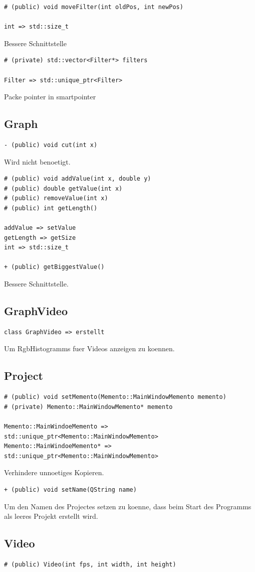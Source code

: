 \documentclass{scrartcl}
\begin{document}
{\begin{verbatim}
# (public) void moveFilter(int oldPos, int newPos)

int => std::size_t
\end{verbatim}
Bessere Schnittstelle
\begin{verbatim}
# (private) std::vector<Filter*> filters

Filter => std::unique_ptr<Filter>
\end{verbatim}
Packe pointer in smartpointer
\subsection{Graph}
\begin{verbatim}
- (public) void cut(int x)
\end{verbatim}
Wird nicht benoetigt.
\begin{verbatim}
# (public) void addValue(int x, double y)
# (public) double getValue(int x)
# (public) removeValue(int x)
# (public) int getLength()

addValue => setValue
getLength => getSize
int => std::size_t

+ (public) getBiggestValue()
\end{verbatim}
Bessere Schnittstelle.
\subsection{GraphVideo}
\begin{verbatim}
class GraphVideo => erstellt
\end{verbatim}
Um RgbHistogramms fuer Videos anzeigen zu koennen.
\subsection{Project}
\begin{verbatim}
# (public) void setMemento(Memento::MainWindowMemento memento)
# (private) Memento::MainWindowMemento* memento

Memento::MainWindoeMemento => std::unique_ptr<Memento::MainWindowMemento>
Memento::MainWindoeMemento* => std::unique_ptr<Memento::MainWindowMemento>
\end{verbatim}
Verhindere unnoetiges Kopieren.
\begin{verbatim}
+ (public) void setName(QString name)
\end{verbatim}
Um den Namen des Projectes setzen zu koenne, dass beim Start des Programms als leeres Projekt erstellt wird.
\subsection{Video}
\begin{verbatim}
# (public) Video(int fps, int width, int height)


\end{verbatim}}
\end{document}
